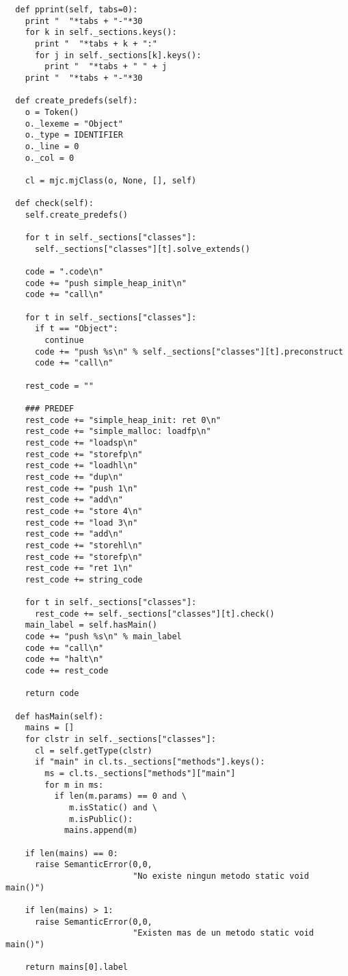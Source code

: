 \documentclass [a4paper,abstracton,titlepage]{scrartcl}
\begin{document}
\begin{lstlisting}
  def pprint(self, tabs=0):
    print "  "*tabs + "-"*30
    for k in self._sections.keys():
      print "  "*tabs + k + ":"
      for j in self._sections[k].keys():
        print "  "*tabs + " " + j
    print "  "*tabs + "-"*30

  def create_predefs(self):
    o = Token()
    o._lexeme = "Object"
    o._type = IDENTIFIER
    o._line = 0
    o._col = 0

    cl = mjc.mjClass(o, None, [], self)

  def check(self):
    self.create_predefs()

    for t in self._sections["classes"]:
      self._sections["classes"][t].solve_extends()

    code = ".code\n"
    code += "push simple_heap_init\n"
    code += "call\n"

    for t in self._sections["classes"]:
      if t == "Object":
        continue
      code += "push %s\n" % self._sections["classes"][t].preconstruct
      code += "call\n"

    rest_code = ""

    ### PREDEF
    rest_code += "simple_heap_init: ret 0\n"
    rest_code += "simple_malloc: loadfp\n"
    rest_code += "loadsp\n"
    rest_code += "storefp\n"
    rest_code += "loadhl\n"
    rest_code += "dup\n"
    rest_code += "push 1\n"
    rest_code += "add\n"
    rest_code += "store 4\n"
    rest_code += "load 3\n"
    rest_code += "add\n"
    rest_code += "storehl\n"
    rest_code += "storefp\n"
    rest_code += "ret 1\n"
    rest_code += string_code

    for t in self._sections["classes"]:
      rest_code += self._sections["classes"][t].check()
    main_label = self.hasMain()
    code += "push %s\n" % main_label
    code += "call\n"
    code += "halt\n"
    code += rest_code

    return code

  def hasMain(self):
    mains = []
    for clstr in self._sections["classes"]:
      cl = self.getType(clstr)
      if "main" in cl.ts._sections["methods"].keys():
        ms = cl.ts._sections["methods"]["main"]
        for m in ms:
          if len(m.params) == 0 and \
             m.isStatic() and \
             m.isPublic():
            mains.append(m)

    if len(mains) == 0:
      raise SemanticError(0,0,
                          "No existe ningun metodo static void main()")

    if len(mains) > 1:
      raise SemanticError(0,0,
                          "Existen mas de un metodo static void main()")

    return mains[0].label
    \end{lstlisting}
\end{document}
